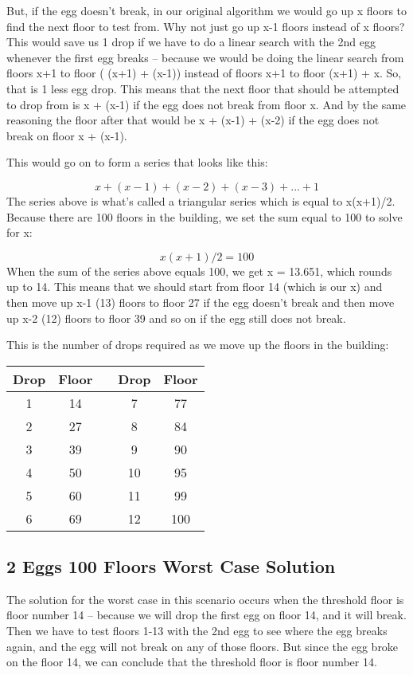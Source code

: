 \documentclass[]{article}
\begin{document}
But, if the egg doesn’t break, in our original algorithm we would go up x floors to find the next floor to test from. Why not just go up x-1 floors instead of x floors? This would save us 1 drop if we have to do a linear search with the 2nd egg whenever the first egg breaks – because we would be doing the linear search from floors x+1 to floor ( (x+1) + (x-1)) instead of floors x+1 to floor (x+1) + x. So, that is 1 less egg drop. This means that the next floor that should be attempted to drop from is x + (x-1) if the egg does not break from floor x. And by the same reasoning the floor after that would be x + (x-1) + (x-2) if the egg does not break on floor x + (x-1).

This would go on to form a series that looks like this:

\[x + (x-1) + (x-2) + (x-3) + ... + 1\]
The series above is what’s called a triangular series which is equal to x(x+1)/2. Because there are 100 floors in the building, we set the sum equal to 100 to solve for x:

\[x(x+1)/2 = 100\]
When the sum of the series above equals 100, we get x = 13.651, which rounds up to 14. This means that we should start from floor 14 (which is our x) and then move up x-1 (13) floors to floor 27 if the egg doesn’t break and then move up x-2 (12) floors to floor 39 and so on if the egg still does not break.

This is the number of drops required as we move up the floors in the building:

\begin{tabular}{|c|c|c|c|c|}
	\hline
 Drop 	& Floor &&  Drop 	& Floor \\ \hline
 1	& 14   && 7 &	77 \\
 2	& 27  && 8 &	84\\
 3	& 39 && 9 &	90\\
 4	& 50 && 10 &	95\\
 5	& 60 && 11 &	99\\
 6	& 69 && 12 &	100\\
\end{tabular} 








\subsection{2 Eggs 100 Floors Worst Case Solution}

The solution for the worst case in this scenario occurs when the threshold floor is floor number 14 – because we will drop the first egg on floor 14, and it will break. Then we have to test floors 1-13 with the 2nd egg to see where the egg breaks again, and the egg will not break on any of those floors. But since the egg broke on the floor 14, we can conclude that the threshold floor is floor number 14.
\end{document}
